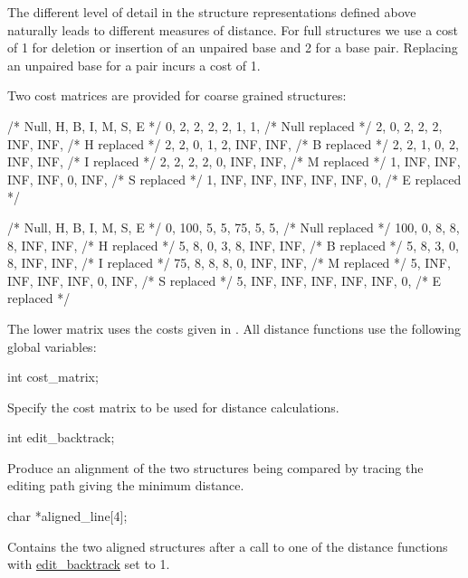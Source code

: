 The different level of detail in the structure representations defined above naturally leads to different measures of distance. For full structures we use a cost of 1 for deletion or insertion of an unpaired base and 2 for a base pair. Replacing an unpaired base for a pair incurs a cost of 1.

Two cost matrices are provided for coarse grained structures\+:

\begin{DoxyVerb}/*  Null,   H,   B,   I,   M,   S,   E    */
   {   0,   2,   2,   2,   2,   1,   1},   /* Null replaced */
   {   2,   0,   2,   2,   2, INF, INF},   /* H    replaced */
   {   2,   2,   0,   1,   2, INF, INF},   /* B    replaced */
   {   2,   2,   1,   0,   2, INF, INF},   /* I    replaced */
   {   2,   2,   2,   2,   0, INF, INF},   /* M    replaced */
   {   1, INF, INF, INF, INF,   0, INF},   /* S    replaced */
   {   1, INF, INF, INF, INF, INF,   0},   /* E    replaced */


/* Null,   H,   B,   I,   M,   S,   E   */
   {   0, 100,   5,   5,  75,   5,   5},   /* Null replaced */
   { 100,   0,   8,   8,   8, INF, INF},   /* H    replaced */
   {   5,   8,   0,   3,   8, INF, INF},   /* B    replaced */
   {   5,   8,   3,   0,   8, INF, INF},   /* I    replaced */
   {  75,   8,   8,   8,   0, INF, INF},   /* M    replaced */
   {   5, INF, INF, INF, INF,   0, INF},   /* S    replaced */
   {   5, INF, INF, INF, INF, INF,   0},   /* E    replaced */
\end{DoxyVerb}


The lower matrix uses the costs given in \cite{shapiro:1990}. All distance functions use the following global variables\+:

\begin{DoxyVerb}int  cost_matrix;
\end{DoxyVerb}
 Specify the cost matrix to be used for distance calculations.

\begin{DoxyVerb}int   edit_backtrack;
\end{DoxyVerb}
 Produce an alignment of the two structures being compared by tracing the editing path giving the minimum distance.

\begin{DoxyVerb}char *aligned_line[4];
\end{DoxyVerb}
 Contains the two aligned structures after a call to one of the distance functions with \mbox{\hyperlink{dist__vars_8h_aa03194c513af6b860e7b33e370b82bdb}{edit\+\_\+backtrack}} set to 1.

